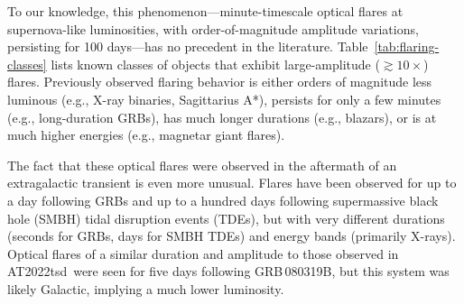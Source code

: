 \documentclass{nature_plusfigure}
\newcommand{\at}{AT2022tsd}
\begin{document}
To our knowledge, this phenomenon---minute-timescale optical flares at supernova-like luminosities, with order-of-magnitude amplitude variations, persisting for 100 days---has no precedent in the literature.
 Table~\ref{tab:flaring-classes} lists known classes of objects that exhibit large-amplitude ($\gtrsim10\times$) flares. Previously observed flaring behavior is either orders of magnitude less luminous (e.g., X-ray binaries\cite{Fender1997}, Sagittarius A*\cite{Marrone2008}), persists for only a few minutes (e.g., long-duration GRBs\cite{Racusin2008}), has much longer durations (e.g., blazars\cite{Nesci2021}), or is at much higher energies (e.g., magnetar giant flares\cite{Hurley1999}).
 
The fact that these optical flares were observed in the aftermath of an extragalactic transient is even more unusual.
Flares have been observed for up to a day following GRBs\cite{Kumar2015} and up to a hundred days following supermassive black hole (SMBH) tidal disruption events (TDEs\cite{vanVelzen2021}), but with very different durations (seconds for GRBs, days for SMBH TDEs) and energy bands (primarily X-rays). Optical flares of a similar duration and amplitude to those observed in \at\ were seen for five days following GRB\,080319B, but this system was likely Galactic\cite{Kasliwal2008,CastroTirado2008,Stefanescu2008}, implying a much lower luminosity.
\end{document}

